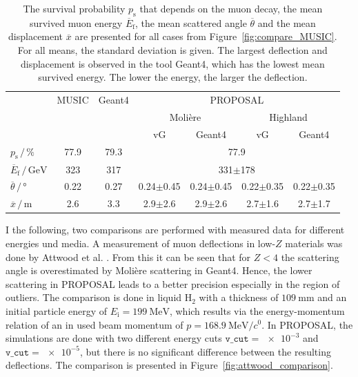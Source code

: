 \documentclass[pdflatex, sn-mathphys]{sn-jnl}%
\theoremstyle{thmstyleone}%
\theoremstyle{thmstyletwo}%
\theoremstyle{thmstylethree}%
\begin{document}
\begin{table}
    \small
    \centering
    \caption{The survival probability $p_{\text{s}}$ that depends on the muon decay, the mean survived muon 
    energy $\overline{E}_{\text{f}}$, the mean scattered angle $\overline{\theta}$ 
    and the mean displacement $\overline{x}$ are presented for all cases from 
    Figure~\ref{fig:compare_MUSIC}. For all means, the standard deviation is given.
    The largest deflection and displacement is observed in the tool Geant4, which has the lowest mean survived energy. The lower the energy, the larger the deflection.}
    \begin{tabular}{l|cc|cccc}
        \toprule
        & MUSIC & Geant4 & \multicolumn{4}{c}{PROPOSAL} \\
        &  & & \multicolumn{2}{c}{Molière} & \multicolumn{2}{c}{Highland} \\
        &  &  & vG & Geant4 & vG & Geant4 \\
        \midrule
        $p_{\text{s}}\,/\,\si{\percent}$ & 77.9 & 79.3 &  \multicolumn{4}{c}{77.9}\\
        $\overline{E}_{\text{f}}\,/\,\si{\giga\electronvolt}$ & 323 & 317 & \multicolumn{4}{c}{331$\pm$178} \\
        $\overline{\theta}\,/\,\si{\degree}$ & 0.22 & 0.27 & 0.24$\pm$0.45 & 0.24$\pm$0.45 & 0.22$\pm$0.35 & 0.22$\pm$0.35   \\
        $\overline{x}\,/\,\si{\meter}$ & 2.6 & 3.3 & 2.9$\pm$2.6 & 2.9$\pm$2.6 & 2.7$\pm$1.6 & 2.7$\pm$1.7  \\
     \bottomrule
    \end{tabular}
    \label{tab:compare_MUSIC}
\end{table}

I the following, two comparisons are performed with measured data for 
different energies und media.
A measurement of muon deflections in low-$Z$ materials was done by Attwood et al. \cite{attwood_2006}. 
From this it can be seen that for $Z < 4$ the scattering angle is overestimated 
by Molière scattering in Geant4. Hence, the lower scattering in PROPOSAL leads 
to a better precision especially in the region of outliers. The comparison is 
done in liquid $\text{H}_2$ with a thickness of $\SI{109}{\milli\meter}$ and an 
initial particle energy of $E_{\mathrm{i}} = \SI{199}{\mega\electronvolt}$, which 
results via the energy-momentum relation of an in \cite{attwood_2006} used beam momentum 
of $p = \SI[per-mode=symbol]{168.9}{\mega\electronvolt\per\clight}$. 
In PROPOSAL, the simulations are done with two different energy cuts $\texttt{v\_cut} = \num{e-3}$ and $\texttt{v\_cut} = \num{e-5}$, 
but there is no significant difference between the resulting deflections.
The comparison is presented in Figure~\ref{fig:attwood_comparison}.
\end{document}
